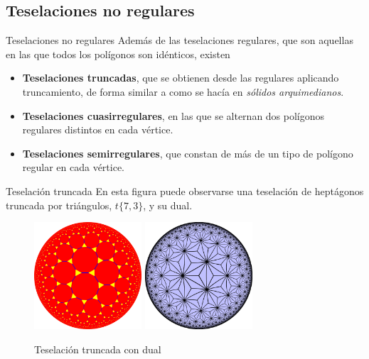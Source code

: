 \documentclass[compress]{beamer}
\begin{document}
\subsection{Teselaciones no regulares}
\begin{frame}{Teselaciones no regulares}
  Además de las teselaciones regulares, que son aquellas en las que
  todos los polígonos son idénticos, existen

  \begin{itemize}
  \item \textbf{Teselaciones truncadas}, que se obtienen desde las
    regulares aplicando truncamiento, de forma similar a como se hacía
    en \textit{sólidos arquimedianos}.
    \pause
  \item \textbf{Teselaciones cuasirregulares}, en las que se alternan
    dos polígonos regulares distintos en cada vértice.
    \pause
  \item \textbf{Teselaciones semirregulares}, que constan de más de un
    tipo de polígono regular en cada vértice.
  \end{itemize}
\end{frame}

\begin{frame}{Teselación truncada}
  En esta figura puede observarse una teselación de heptágonos
  truncada por triángulos, $t\{7,3\}$, y su dual.

  \begin{figure}[ht!]
    \centering
    \includegraphics[width=40mm]{./tiling73t.png}
    \quad
    \includegraphics[width=40mm]{./tiling73tdual.png}
    \caption{Teselación truncada con dual\label{tilingt7}}
  \end{figure}
\end{frame}
\end{document}
